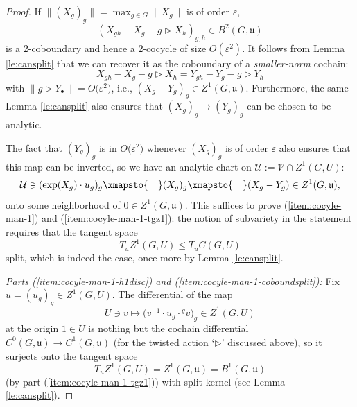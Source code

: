 \documentclass[10pt,a4paper]{amsart}
\numberwithin{equation}{section}
\newcommand\cU{{\mathcal U}}
\newcommand\cV{{\mathcal V}}
\newcommand\fu{{\mathfrak u}}
\begin{document}
\begin{proof}
 If $\|(X_g)_g\| = \max_{g\in G} \|X_g\|$ is of order $\varepsilon$,
 \begin{equation*}
 \left(X_{gh} - X_g - g\triangleright X_h\right)_{g,h}\in B^2(G,\fu)
 \end{equation*}
 is a 2-coboundary and hence a 2-cocycle of size $O(\varepsilon^2)$. It follows from Lemma \ref{le:cansplit} that we can recover it as the coboundary of a {\it smaller-norm} cochain:
 \begin{equation*}
 X_{gh} - X_g - g\triangleright X_h
 =
 Y_{gh} - Y_g - g\triangleright Y_h
 \end{equation*}
 with $\|g\triangleright Y_{\bullet}\|=O\big(\varepsilon^2\big)$, i.e., $(X_g-Y_g)_g\in Z^1(G,\fu)$.
 Furthermore, the same Lemma \ref{le:cansplit} also ensures that $(X_g)_g\mapsto (Y_g)_g$ can be chosen to be analytic.

 The fact that $(Y_g)_g$ is in $O\big(\varepsilon^2\big)$ whenever $(X_g)_g$ is of order $\varepsilon$ also ensures that this map can be inverted, so we have an analytic chart on $\cU:=\cV\cap Z^1(G,U)$:
 \begin{equation*}
 \cU\ni (\exp(X_g)\cdot u_g)_g
 \xmapsto{\quad}
 (X_g)_g
 \xmapsto{\quad}
 (X_g-Y_g)\in Z^1(G,\fu),
 \end{equation*}
 onto some neighborhood of $0\in Z^1(G,\fu)$. This suffices to prove (\ref{item:cocyle-man-1}) and (\ref{item:cocyle-man-1-tgz1}): the notion of subvariety in the statement requires that the tangent space
 \begin{equation*}
 T_u Z^1(G,U)\le T_u C(G,U)
 \end{equation*}
 split, which is indeed the case, once more by Lemma \ref{le:cansplit}.

\emph{ Parts {\rm(\ref{item:cocyle-man-1-h1disc})} and {\rm(\ref{item:cocyle-man-1-coboundsplit})}:} Fix $u=(u_g)_g\in Z^1(G,U)$.
 The differential of the map
 \begin{equation}\label{eq:noncommdiff}
 U\ni v\mapsto \big(v^{-1}\cdot u_g\cdot {}^g v\big)_g\in Z^1(G,U)
 \end{equation}
 at the origin $1\in U$ is nothing but the cochain differential $C^0(G,\fu)\to C^1(G,\fu)$ (for the twisted action `$\triangleright$' discussed above), so it surjects onto the tangent space
 \begin{equation*}
 T_u Z^1(G,U) = Z^1(G,\fu) = B^1(G,\fu)
 \end{equation*}
 (by part (\ref{item:cocyle-man-1-tgz1})) with split kernel (see Lemma \ref{le:cansplit}).


\end{proof}
\end{document}
